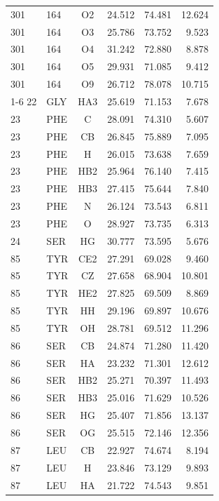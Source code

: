 \begin{table}[htbp]
{\begin{tabular}{@{}llcrrr@{}}
301  & 164  & O2    &  24.512 &  74.481 &  12.624 \\
301  & 164  & O3    &  25.786 &  73.752 &   9.523 \\
301  & 164  & O4    &  31.242 &  72.880 &   8.878 \\
301  & 164  & O5    &  29.931 &  71.085 &   9.412 \\
301  & 164  & O9    &  26.712 &  78.078 &  10.715 \\
\cmidrule(lr){1-6}
22   & GLY  & HA3   &  25.619 &  71.153 &   7.678 \\
23   & PHE  & C     &  28.091 &  74.310 &   5.607 \\
23   & PHE  & CB    &  26.845 &  75.889 &   7.095 \\
23   & PHE  & H     &  26.015 &  73.638 &   7.659 \\
23   & PHE  & HB2   &  25.964 &  76.140 &   7.415 \\
23   & PHE  & HB3   &  27.415 &  75.644 &   7.840 \\
23   & PHE  & N     &  26.124 &  73.543 &   6.811 \\
23   & PHE  & O     &  28.927 &  73.735 &   6.313 \\
24   & SER  & HG    &  30.777 &  73.595 &   5.676 \\
85   & TYR  & CE2   &  27.291 &  69.028 &   9.460 \\
85   & TYR  & CZ    &  27.658 &  68.904 &  10.801 \\
85   & TYR  & HE2   &  27.825 &  69.509 &   8.869 \\
85   & TYR  & HH    &  29.196 &  69.897 &  10.676 \\
85   & TYR  & OH    &  28.781 &  69.512 &  11.296 \\
86   & SER  & CB    &  24.874 &  71.280 &  11.420 \\
86   & SER  & HA    &  23.232 &  71.301 &  12.612 \\
86   & SER  & HB2   &  25.271 &  70.397 &  11.493 \\
86   & SER  & HB3   &  25.016 &  71.629 &  10.526 \\
86   & SER  & HG    &  25.407 &  71.856 &  13.137 \\
86   & SER  & OG    &  25.515 &  72.146 &  12.356 \\
87   & LEU  & CB    &  22.927 &  74.674 &   8.194 \\
87   & LEU  & H     &  23.846 &  73.129 &   9.893 \\
87   & LEU  & HA    &  21.722 &  74.543 &   9.851 \\

\end{tabular}}
\end{table}
